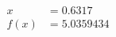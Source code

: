 \documentclass[preview]{standalone}
\begin{document}
\begin{align*}
x &= 0.6317\\f(x) &= 5.0359434
\end{align*}
\end{document}
